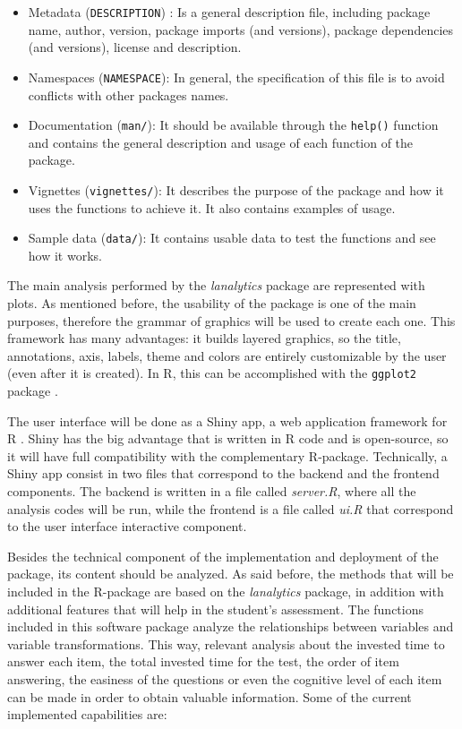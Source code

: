 \documentclass{article}
\begin{document}
\begin{itemize}
\item Metadata (\texttt{DESCRIPTION}) : Is a general description file, including package name, author, version, package imports (and versions), package dependencies (and versions), license and description.
\item Namespaces (\texttt{NAMESPACE}): In general, the specification of this file is to avoid conflicts with other packages names.
\item Documentation (\texttt{man/}): It should be available through the \texttt{help()} function and contains the general description and usage of each function of the package.
\item Vignettes (\texttt{vignettes/}): It describes the purpose of the package and how it uses the functions to achieve it. It also contains examples of usage.
\item Sample data (\texttt{data/}): It contains usable data to test the functions and see how it works.
\end{itemize}

The main analysis performed by the \textit{lanalytics} package are represented with plots. As mentioned before, the usability of the package is one of the main purposes, therefore the grammar of graphics will be used to create each one. This framework has many advantages: it builds layered graphics, so the title, annotations, axis, labels, theme and colors are entirely customizable by the user (even after it is created). In \textsf{R}, this can be accomplished with the \texttt{ggplot2} package \cite{ggplot2}.

The user interface will be done as a Shiny app, a web application framework for \textsf{R} \cite{shiny}. Shiny has the big advantage that is written in \textsf{R} code and is open-source, so it will have full compatibility with the complementary \textsf{R}-package. Technically, a Shiny app consist in two files that correspond to the backend and the frontend components. The backend is written in a file called \textit{server.R}, where all the analysis codes will be run, while the frontend is a file called \textit{ui.R} that correspond to the user interface interactive component.

Besides the technical component of the implementation and deployment of the package, its content should be analyzed. As said before, the methods that will be included in the \textsf{R}-package are based on the \textit{lanalytics} package, in addition with additional features that will help in the student's assessment. The functions included in this software package analyze the relationships between variables and variable transformations. This way, relevant analysis about the invested time to answer each item, the total invested time for the test, the order of item answering, the easiness of the questions or even the cognitive level of each item can be made in order to obtain valuable information. Some of the current implemented capabilities are:
\end{document}
